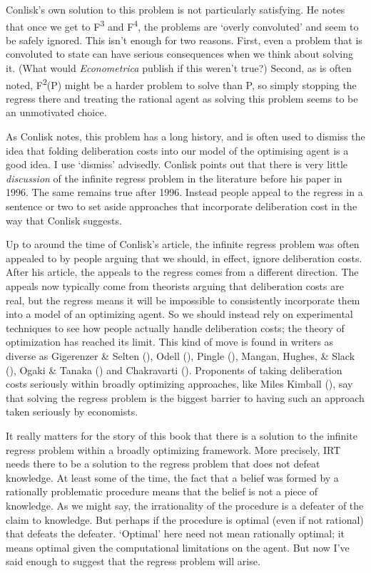 \documentclass[
  10pt,
  letterpaper,
  twoside]{scrbook}
\begin{document}
Conlisk's own solution to this problem is not particularly satisfying.
He notes that once we get to F\textsuperscript{3} and
F\textsuperscript{4}, the problems are `overly convoluted' and seem to
be safely ignored. This isn't enough for two reasons. First, even a
problem that is convoluted to state can have serious consequences when
we think about solving it. (What would \emph{Econometrica} publish if
this weren't true?) Second, as is often noted, F\textsuperscript{2}(P)
might be a harder problem to solve than P, so simply stopping the
regress there and treating the rational agent as solving this problem
seems to be an unmotivated choice.

As Conlisk notes, this problem has a long history, and is often used to
dismiss the idea that folding deliberation costs into our model of the
optimising agent is a good idea. I use `dismiss' advisedly. Conlisk
points out that there is very little \emph{discussion} of the infinite
regress problem in the literature before his paper in 1996. The same
remains true after 1996. Instead people appeal to the regress in a
sentence or two to set aside approaches that incorporate deliberation
cost in the way that Conlisk suggests.

Up to around the time of Conlisk's article, the infinite regress problem
was often appealed to by people arguing that we should, in effect,
ignore deliberation costs. After his article, the appeals to the regress
comes from a different direction. The appeals now typically come from
theorists arguing that deliberation costs are real, but the regress
means it will be impossible to consistently incorporate them into a
model of an optimizing agent. So we should instead rely on experimental
techniques to see how people actually handle deliberation costs; the
theory of optimization has reached its limit. This kind of move is found
in writers as diverse as Gigerenzer \& Selten
(), Odell
(), Pingle
(), Mangan, Hughes, \& Slack
(), Ogaki \& Tanaka
() and Chakravarti
(). Proponents of taking
deliberation costs seriously within broadly optimizing approaches, like
Miles Kimball (), say that solving the
regress problem is the biggest barrier to having such an approach taken
seriously by economists.

It really matters for the story of this book that there is a solution to
the infinite regress problem within a broadly optimizing framework. More
precisely, IRT needs there to be a solution to the regress problem that
does not defeat knowledge. At least some of the time, the fact that a
belief was formed by a rationally problematic procedure means that the
belief is not a piece of knowledge. As we might say, the irrationality
of the procedure is a defeater of the claim to knowledge. But perhaps if
the procedure is optimal (even if not rational) that defeats the
defeater. `Optimal' here need not mean rationally optimal; it means
optimal given the computational limitations on the agent. But now I've
said enough to suggest that the regress problem will arise.
\end{document}
